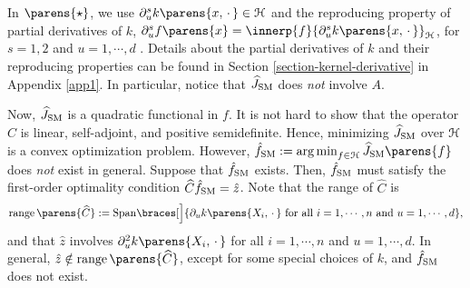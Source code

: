 In $\parens{\star}$, we use $\partial_u^s k \parens{x, \,\cdot\,} \in \calH$ and the reproducing property of partial derivatives of $k$, $\partial_u^s f \parens{x} = \innerp{f}{\partial_u^s k \parens{x, \,\cdot\,}}_{\calH}$, for $s = 1, 2$ and $u = 1, \cdots, d$ \parencites{Zhou2008-jt}. Details about the partial derivatives of $k$ and their reproducing properties can be found in Section \ref{section-kernel-derivative} in Appendix \ref{app1}. In particular, notice that $\widehat{J}_{\mathrm{SM}}$ does \textit{not} involve $A$. 

Now, $\widehat{J}_{\mathrm{SM}}$ is a quadratic functional in $f$. It is not hard to show that the operator $\widehat{C}$ is linear, self-adjoint, and positive semidefinite. Hence, minimizing $\widehat{J}_{\mathrm{SM}}$ over $\mathcal{H}$ is a convex optimization problem. However, $\hat{f}_{\SM} := \argmin_{f \in \calH} \widehat{J}_{\SM} \parens{f}$ does \emph{not} exist in general. Suppose that $\hat{f}_{\mathrm{SM}}$ exists. Then, $\hat{f}_{\mathrm{SM}}$ must satisfy the first-order optimality condition $\widehat{C} \hat{f}_{\mathrm{SM}} = \hat{z}$. Note that the range of $\widehat{C}$ is 
\begin{align*}
	\range \parens{\widehat{C}} := \mathrm{Span} \braces[\Big]{\partial_u k \parens{X_i, \,\cdot\,} \text{ for all } i = 1, \cdots, n \text{ and } u = 1, \cdots, d}, 
\end{align*}
and that $\hat{z}$ involves $\partial_u^2 k \parens{X_i, \,\cdot\,}$ for all $i = 1, \cdots, n$ and $u = 1, \cdots, d$. In general, $\hat{z} \notin \range \parens{\widehat{C}}$, except for some special choices of $k$, and $\hat{f}_{\mathrm{SM}}$ does not exist. 


